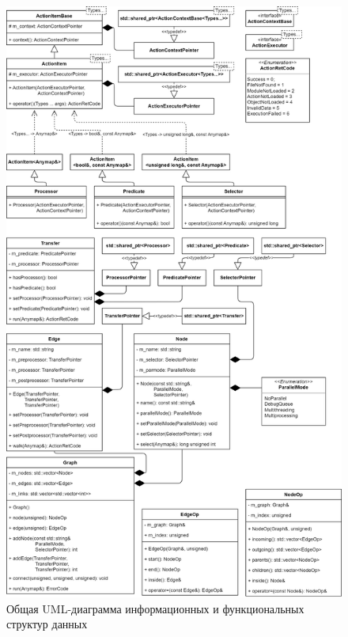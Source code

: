 \begin{figure}[H]
    \centering
    \includegraphics[height=0.95\textheight]{figures/UML.everything.png}
    \caption{Общая UML-диаграмма информационных и функциональных структур данных}
    \label{fig:UMLAll}
\end{figure}

